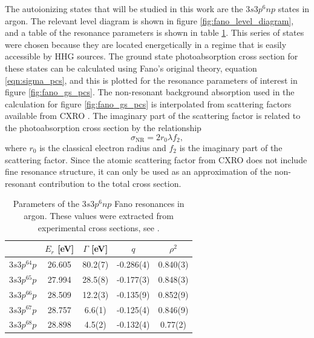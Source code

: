 The autoionizing states that will  be studied in this work are the $3s3p^6 np$ states in argon.  The relevant level diagram is shown in figure \ref{fig:fano_level_diagram}, and a table of the resonance parameters is shown in table \ref{table:fano_params}.   This series of states were chosen because they are located energetically in a regime that is easily accessible by HHG sources. The ground state photoabsorption cross section for these states can be calculated using Fano's original theory, equation \ref{eqn:sigma_pcs}, and this is plotted for the resonance parameters of interest in figure \ref{fig:fano_gs_pcs}.  The non-resonant background absorption used in the calculation for figure \ref{fig:fano_gs_pcs} is interpolated from scattering factors available from CXRO \cite{henkeXRayInteractionsPhotoabsorption1993}.  The imaginary part of the scattering factor is related to the photoabsorption cross section by the relationship
\begin{equation}
	\label{eqn:imaginary_scattering_factor}
	\sigma_{\mathrm{NR}}=2 r_0 \lambda f_2,
\end{equation}
where $r_0$ is the classical electron radius and $f_2$ is the imaginary part of the scattering factor.  Since the atomic scattering factor from CXRO does not include fine resonance structure, it can only be used as an approximation of the non-resonant contribution to the total cross section.
\begin{table}[]
	\centering
	\begin{tabular}{|ccccc|}
		\hline\hline
		\multicolumn{1}{|c}{}  & $E_r$ [eV]   & $\Gamma$ [eV]   & $q$         & $\rho^2$     \\ \hline
		$3s3p^64p$              & 26.605 & 80.2(7) & -0.286(4) & 0.840(3) \\
		$3s3p^65p$              & 27.994 & 28.5(8) & -0.177(3) & 0.848(3) \\
		$3s3p^66p$              & 28.509 & 12.2(3) & -0.135(9) & 0.852(9) \\
		$3s3p^67p$              & 28.757 & 6.6(1)  & -0.125(4) & 0.846(9) \\
		$3s3p^68p$              & 28.898 & 4.5(2)  & -0.132(4) & 0.77(2)  \\ \hline\hline
	\end{tabular}
	\caption[Parameters of the $3s3p^6np$ Fano resonances in argon]{Parameters of the $3s3p^6np$ Fano resonances in argon. These values were extracted from experimental cross sections, see \cite{caretteMulticonfigurationalHartreeFockClosecoupling2013, wuElectronimpactStudyValence1995, berrahAngulardistributionParametersAndRmatrix1996}.}
	\label{table:fano_params}
\end{table}


